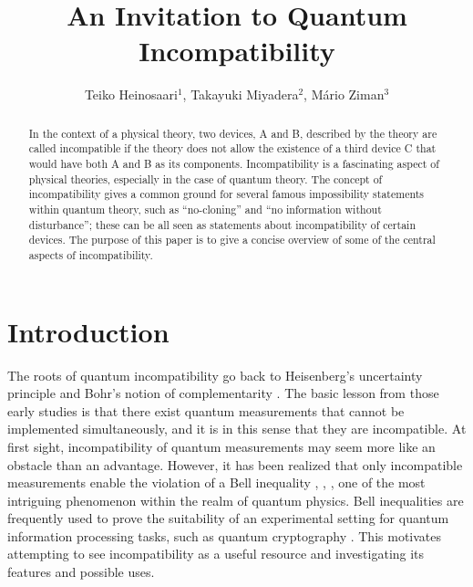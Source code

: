 \documentclass[12pt]{iopart}
\theoremstyle{definition}
\begin{document}
\setlength{\arraycolsep}{2pt}

\title[An Invitation to Quantum Incompatibility]{An Invitation to Quantum Incompatibility}

\author{
Teiko Heinosaari$^1$,
Takayuki Miyadera$^2$,
M\'ario Ziman$^3$
}
\address{$^1$Turku Centre for Quantum Physics, Department of Physics and Astronomy, University of Turku, FI-20014 Turku, Finland}
\address{$^2$Department of Nuclear Engineering, Kyoto University,
Kyoto daigaku-katsura, Nishikyo-ku, Kyoto, 615-8540, Japan}
\address{$^3$Institute of Physics, Slovak Academy of Sciences, D\'ubravsk\'a cesta 9, 84511 Bratislava, Slovakia}


\begin{abstract} 
In the context of a physical theory, two devices, A and B, described by the theory are called incompatible if the theory does not allow the existence of a third device C that would have both A and B as its components.
Incompatibility is a fascinating aspect of physical theories, especially in the case of quantum theory. 
The concept of incompatibility gives a common ground for several famous impossibility statements within quantum theory, such as ``no-cloning'' and ``no information without disturbance''; these can be all seen as statements about incompatibility of certain devices.
The purpose of this paper is to give a concise overview of some of the central aspects of incompatibility. 
\end{abstract}

\section{Introduction}\label{sec:intro}

The roots of quantum incompatibility go back to Heisenberg's uncertainty principle \cite{Heisenberg27} and Bohr's notion of complementarity \cite{Bohr28}. 
The basic lesson from those early studies is that there exist quantum measurements that cannot be implemented simultaneously, and it is in this sense that they are incompatible. 
At first sight, incompatibility of quantum measurements may seem more like an obstacle than an advantage. 
However, it has been realized that only incompatible measurements enable the violation of a Bell inequality \cite{Fine82}, \cite{MaAcGi06}, \cite{WoPeFe09}, one of the most intriguing phenomenon within the realm of quantum physics.
Bell inequalities are frequently used to prove the suitability of an experimental setting for quantum information processing tasks, such as quantum cryptography \cite{BrCaPiScWe14}.
This motivates attempting to see incompatibility as a useful resource and investigating its features and possible uses. 
\end{document}
